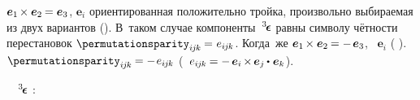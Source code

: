  ${\bm{e}_1 \hspace{-0.2ex} \times \bm{e}_2 \hspace{-0.15ex} = \bm{e}_3}$,
 ${\bm{e}_i}$  ориентированная положительно тройка, произвольно выбираемая из двух вариантов ().
В~таком случае
компоненты~${^3\hspace{-0.25ex}\bm{\epsilon}}\hspace{.05ex}$
равны символу чётности перестановок
${\permutationsparity_{i\hspace{-0.1ex}j\hspace{-0.1ex}k} \hspace{-0.1ex} = \hspace{.1ex} e_{i\hspace{-0.1ex}j\hspace{-0.1ex}k}}$.
Когда~же ${\bm{e}_1 \hspace{-0.2ex} \times \bm{e}_2 \hspace{-0.15ex} = - \hspace{.25ex} \bm{e}_3}$,  ~${\bm{e}_i}$  ( ).
  ${\permutationsparity_{i\hspace{-0.1ex}j\hspace{-0.1ex}k} \hspace{-0.1ex} = - \hspace{.2ex} e_{i\hspace{-0.1ex}j\hspace{-0.1ex}k}}$
(~${e_{i\hspace{-0.1ex}j\hspace{-0.1ex}k} \hspace{-0.12ex} = - \hspace{.33ex} \bm{e}_i \hspace{-0.2ex} \times \hspace{-0.2ex} \bm{e}_j \hspace{-0.1ex} \dotp \hspace{.12ex} \bm{e}_k}$).








~~${^3\hspace{-0.25ex}\bm{\epsilon}}\hspace{.05ex}$   :

